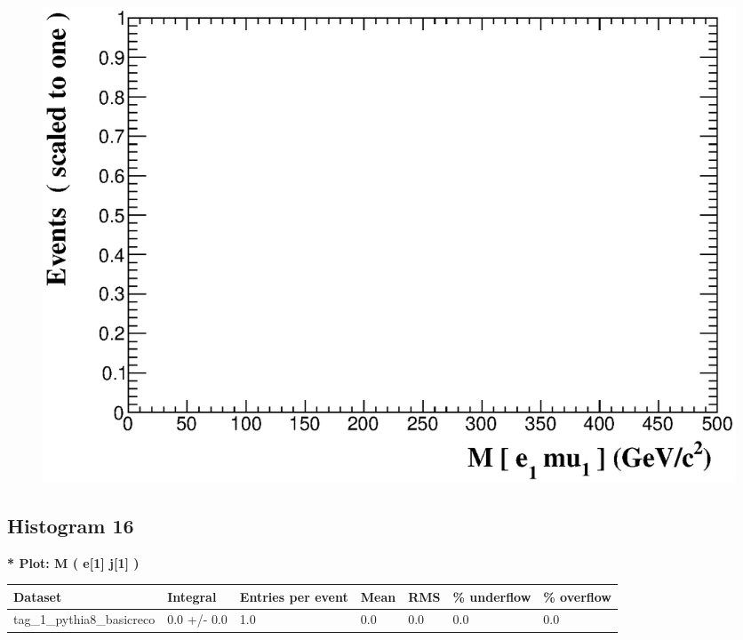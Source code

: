 \documentclass[a4paper, 10pt]{article}
\begin{document}
\begin{figure}[H]
  \begin{center}
    \includegraphics[scale=0.45]{selection_14.eps}\\
\caption{   }
  \end{center}
\end{figure}
      \newpage
\subsection{ Histogram 16}

\textbf{* Plot: M ( e[1] j[1] ) }\\
   \begin{table}[H]
  \begin{center}
    \begin{tabular}{|m{23.0mm}|m{23.0mm}|m{18.0mm}|m{19.0mm}|m{19.0mm}|m{19.0mm}|m{19.0mm}|}
      \hline
      {\cellcolor{yellow}         Dataset}& {\cellcolor{yellow}         Integral}& {\cellcolor{yellow}         Entries per event}& {\cellcolor{yellow}         Mean}& {\cellcolor{yellow}         RMS}& {\cellcolor{yellow}         \% underflow}& {\cellcolor{yellow}         \% overflow}\\
      \hline
      {\cellcolor{white}         tag\_1\_pythia8\_basicreco}& {\cellcolor{white}         0.0 +/\-- 0.0}& {\cellcolor{white}         1.0}& {\cellcolor{white}         0.0}& {\cellcolor{white}         0.0}& {\cellcolor{green}         0.0}& {\cellcolor{green}         0.0}\\
\hline
    \end{tabular}
  \end{center}
\end{table}
\end{document}
